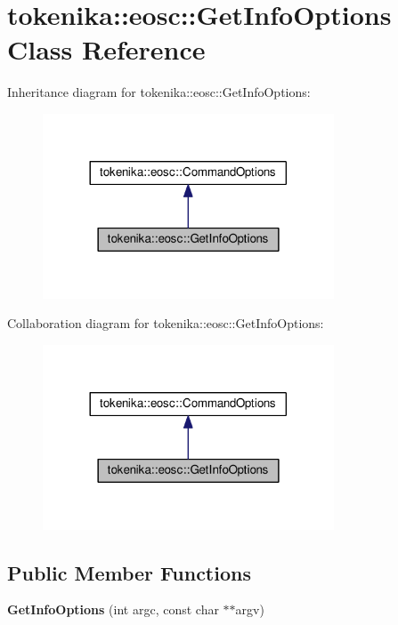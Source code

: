 \hypertarget{classtokenika_1_1eosc_1_1_get_info_options}{}\section{tokenika\+:\+:eosc\+:\+:Get\+Info\+Options Class Reference}
\label{classtokenika_1_1eosc_1_1_get_info_options}


Inheritance diagram for tokenika\+:\+:eosc\+:\+:Get\+Info\+Options\+:
\nopagebreak
\begin{figure}[H]
\begin{center}
\leavevmode
\includegraphics[width=245pt]{classtokenika_1_1eosc_1_1_get_info_options__inherit__graph}
\end{center}
\end{figure}


Collaboration diagram for tokenika\+:\+:eosc\+:\+:Get\+Info\+Options\+:
\nopagebreak
\begin{figure}[H]
\begin{center}
\leavevmode
\includegraphics[width=245pt]{classtokenika_1_1eosc_1_1_get_info_options__coll__graph}
\end{center}
\end{figure}
\subsection*{Public Member Functions}
\begin{DoxyCompactItemize}
\item 
\mbox{\label{classtokenika_1_1eosc_1_1_get_info_options_a9d3325947476e5eb6f3a44ebd28c02d8}} 
{\bfseries Get\+Info\+Options} (int argc, const char $\ast$$\ast$argv)
\end{DoxyCompactItemize}
